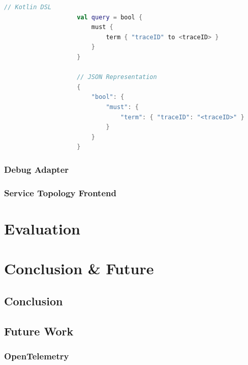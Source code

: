 \documentclass[12pt,pdftex,titlepage]{report}
\begin{document}
                \begin{lstlisting}[caption={Comparison between Elasticsearch query using Kotlin DSL and the query in its JSON representation, where $\langle$traceID$\rangle$ refers
                    to a variable storing the trace identifier.}, language=Kotlin, gobble=20]
                    // Kotlin DSL
                    val query = bool {
                        must {
                            term { "traceID" to <traceID> }
                        }
                    }

                    // JSON Representation
                    {
                        "bool": {
                            "must": {
                                "term": { "traceID": "<traceID>" }
                            }
                        }
                    }
                \end{lstlisting}
            \subsection{Debug Adapter}
            
            \subsection{Service Topology Frontend}
            

    \chapter{Evaluation}
    
    \chapter{Conclusion \& Future}
        \section{Conclusion}

        \section{Future Work}
            \subsection{OpenTelemetry}
\end{document}
